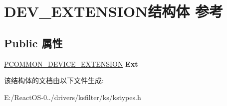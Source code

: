 \hypertarget{struct_d_e_v___e_x_t_e_n_s_i_o_n}{}\section{D\+E\+V\+\_\+\+E\+X\+T\+E\+N\+S\+I\+O\+N结构体 参考}
\label{struct_d_e_v___e_x_t_e_n_s_i_o_n}
\subsection*{Public 属性}
\begin{DoxyCompactItemize}
\item 
\mbox{\label{struct_d_e_v___e_x_t_e_n_s_i_o_n_a6d5d55bfbbe6f5f9f9280fbf335cd864}} 
\hyperlink{struct___c_o_m_m_o_n___d_e_v_i_c_e___e_x_t_e_n_s_i_o_n}{P\+C\+O\+M\+M\+O\+N\+\_\+\+D\+E\+V\+I\+C\+E\+\_\+\+E\+X\+T\+E\+N\+S\+I\+ON} {\bfseries Ext}
\end{DoxyCompactItemize}


该结构体的文档由以下文件生成\+:\begin{DoxyCompactItemize}
\item 
E\+:/\+React\+O\+S-\/0../drivers/ksfilter/ks/kstypes.\+h\end{DoxyCompactItemize}
